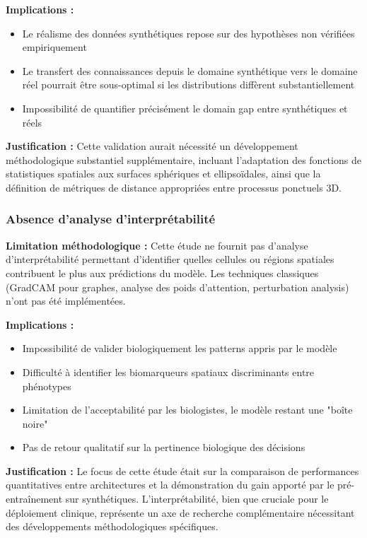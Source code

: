 \textbf{Implications :}
\begin{itemize}
    \item Le réalisme des données synthétiques repose sur des hypothèses non vérifiées empiriquement
    \item Le transfert des connaissances depuis le domaine synthétique vers le domaine réel pourrait être sous-optimal si les distributions diffèrent substantiellement
    \item Impossibilité de quantifier précisément le domain gap entre synthétiques et réels
\end{itemize}

\textbf{Justification :}
Cette validation aurait nécessité un développement méthodologique substantiel supplémentaire, incluant l'adaptation des fonctions de statistiques spatiales aux surfaces sphériques et ellipsoïdales, ainsi que la définition de métriques de distance appropriées entre processus ponctuels 3D.

\subsubsection{Absence d'analyse d'interprétabilité}

\textbf{Limitation méthodologique :}
Cette étude ne fournit pas d'analyse d'interprétabilité permettant d'identifier quelles cellules ou régions spatiales contribuent le plus aux prédictions du modèle. Les techniques classiques (GradCAM pour graphes, analyse des poids d'attention, perturbation analysis) n'ont pas été implémentées.

\textbf{Implications :}
\begin{itemize}
    \item Impossibilité de valider biologiquement les patterns appris par le modèle
    \item Difficulté à identifier les biomarqueurs spatiaux discriminants entre phénotypes
    \item Limitation de l'acceptabilité par les biologistes, le modèle restant une "boîte noire"
    \item Pas de retour qualitatif sur la pertinence biologique des décisions
\end{itemize}

\textbf{Justification :}
Le focus de cette étude était sur la comparaison de performances quantitatives entre architectures et la démonstration du gain apporté par le pré-entraînement sur synthétiques. L'interprétabilité, bien que cruciale pour le déploiement clinique, représente un axe de recherche complémentaire nécessitant des développements méthodologiques spécifiques.


